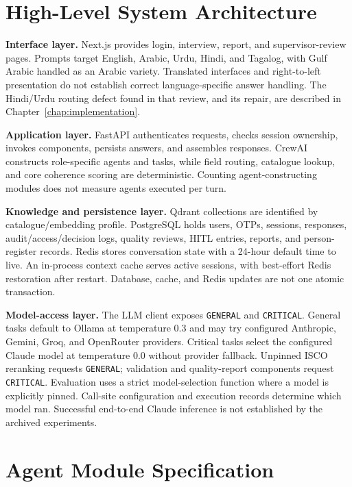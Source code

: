 \section{High-Level System Architecture}
\label{sec:arch-overview}

\textbf{Interface layer.} Next.js provides login, interview, report, and
supervisor-review pages. Prompts target English, Arabic, Urdu, Hindi, and
Tagalog, with Gulf Arabic handled as an Arabic variety. Translated
interfaces and right-to-left presentation do not establish correct
language-specific answer handling. The Hindi/Urdu routing defect found in
that review, and its repair, are described in
Chapter~\ref{chap:implementation}.

\textbf{Application layer.} FastAPI authenticates requests, checks session
ownership, invokes components, persists answers, and assembles responses.
CrewAI constructs role-specific agents and tasks, while field routing,
catalogue lookup, and core coherence scoring are deterministic. Counting
agent-constructing modules does not measure agents executed per turn.

\textbf{Knowledge and persistence layer.} Qdrant collections are identified
by catalogue/embedding profile. PostgreSQL holds users, OTPs, sessions,
responses, audit/access/decision logs, quality reviews, HITL entries,
reports, and person-register records. Redis stores conversation state
with a 24-hour default time to live. An in-process context cache serves
active sessions, with best-effort Redis restoration after restart.
Database, cache, and Redis updates are not one atomic transaction.

\textbf{Model-access layer.} The LLM client exposes \texttt{GENERAL} and
\texttt{CRITICAL}. General tasks default to Ollama at temperature 0.3 and
may try configured Anthropic, Gemini, Groq, and OpenRouter providers.
Critical tasks select the configured Claude model at temperature 0.0
without provider fallback. Unpinned ISCO reranking requests
\texttt{GENERAL}; validation and quality-report components request
\texttt{CRITICAL}. Evaluation uses a strict model-selection function where
a model is explicitly pinned. Call-site configuration and execution
records determine which model ran. Successful end-to-end Claude inference
is not established by the archived experiments.



\section{Agent Module Specification}
\label{sec:arch-agents}

